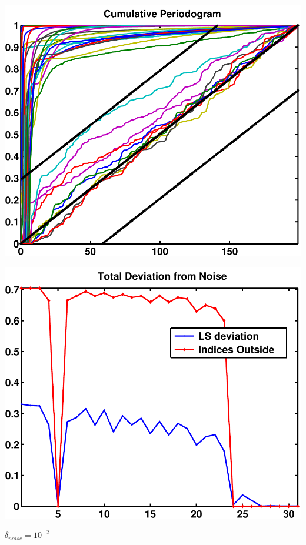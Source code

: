 \documentclass[11pt]{amsart}
\begin{document}
	\vspace{5mm}
	\begin{minipage}[t]{0.5\textwidth}
	
		\includegraphics[width=.95\linewidth]{figures/run4/cum_per} 
   
	\end{minipage}
	\begin{minipage}[t]{0.5\textwidth}
	
		\includegraphics[width=.95\linewidth]{figures/run4/total_deviation} 
   
	\end{minipage}
		\vspace{5mm}
		{\centering $\delta_{noise}=10^{-2}$}
\end{document}
